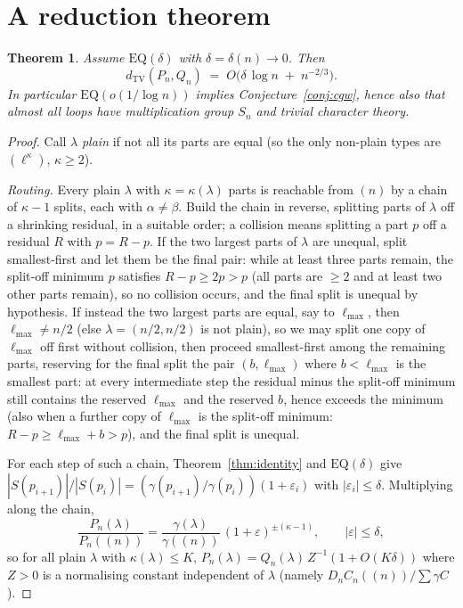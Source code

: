 \documentclass[11pt]{article}
\newtheorem{theorem}{Theorem}[section]
\theoremstyle{definition}
\newcommand{\dtv}{d_{\mathrm{TV}}}
\newcommand{\PP}{P}
\newcommand{\QQ}{Q}
\newcommand{\CC}{C}
\begin{document}


\section{A reduction theorem}\label{sec:reduction}

\begin{theorem}\label{thm:reduction}
Assume $\mathrm{EQ}(\delta)$ with $\delta=\delta(n)\to0$.
Then
\[
\dtv(\PP_n,\QQ_n)\;=\;O\bigl(\delta\,\log n\;+\;n^{-2/3}\bigr).
\]
In particular $\mathrm{EQ}(o(1/\log n))$ implies
Conjecture~\ref{conj:cgw}, hence also that almost all loops have
multiplication group $S_n$ and trivial character theory.
\end{theorem}

\begin{proof}
Call $\lambda$ \emph{plain} if not all its parts are equal (so the only
non-plain types are $(\ell^{\kappa})$, $\kappa\ge2$).

\emph{Routing.}  Every plain $\lambda$ with $\kappa=\kappa(\lambda)$ parts is
reachable from $(n)$ by a chain of $\kappa-1$ splits, each with
$\alpha\ne\beta$.  Build the chain in reverse, splitting parts of $\lambda$
off a shrinking residual, in a suitable order; a collision means splitting a
part $p$ off a residual $R$ with $p=R-p$.  If the two largest parts of
$\lambda$ are unequal, split smallest-first and let them be the final pair:
while at least three parts remain, the split-off minimum $p$ satisfies
$R-p\ge2p>p$ (all parts are $\ge2$ and at least two other parts remain), so
no collision occurs, and the final split is unequal by hypothesis.  If
instead the two largest parts are equal, say to $\ell_{\max}$, then
$\ell_{\max}\neq n/2$ (else $\lambda=(n/2,n/2)$ is not plain), so we may
split one copy of $\ell_{\max}$ off first without collision, then proceed
smallest-first among the remaining parts, reserving for the final split the
pair $(b,\ell_{\max})$ where $b<\ell_{\max}$ is the smallest part: at every
intermediate step the residual minus the split-off minimum still contains
the reserved $\ell_{\max}$ and the reserved $b$, hence exceeds the
minimum (also when a further copy of $\ell_{\max}$ is the split-off
minimum: $R-p\ge\ell_{\max}+b>p$), and the final split is unequal.

For each step of such a chain, Theorem~\ref{thm:identity} and
$\mathrm{EQ}(\delta)$ give
$|S(p_{i+1})|/|S(p_i)|=(\gamma(p_{i+1})/\gamma(p_i))(1+\varepsilon_i)$ with
$|\varepsilon_i|\le\delta$.  Multiplying along the chain,
\[
\frac{\PP_n(\lambda)}{\PP_n((n))}
=\frac{\gamma(\lambda)}{\gamma((n))}\,(1+\varepsilon)^{\pm(\kappa-1)},
\qquad |\varepsilon|\le\delta,
\]
so for all plain $\lambda$ with $\kappa(\lambda)\le K$,
$\PP_n(\lambda)=\QQ_n(\lambda)\,Z^{-1}(1+O(K\delta))$ where $Z>0$ is a
normalising constant independent of $\lambda$ (namely
$D_n\CC_n((n))/\sum\gamma\CC$).


\end{proof}
\end{document}
